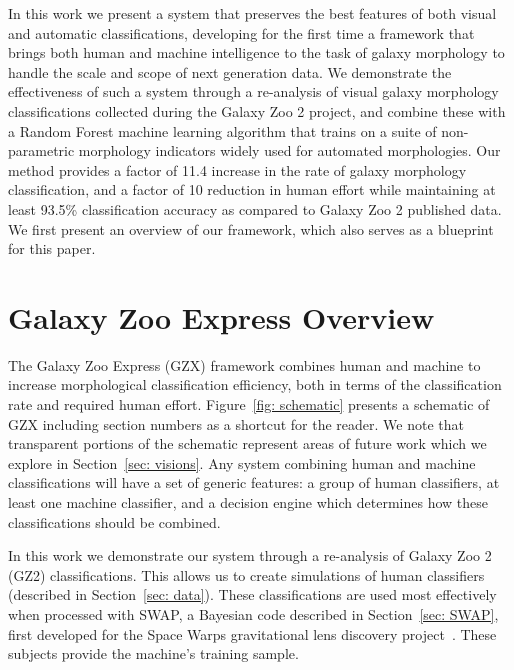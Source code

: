 \documentclass[twocolumn]{aastex6}
\begin{document}
In this work we present a system that preserves the best features of both visual and 
automatic classifications, developing for the first time a framework that brings both 
human and machine intelligence to the task of galaxy morphology to handle the 
scale and scope of next generation data. We demonstrate the effectiveness of such 
a system through a re-analysis of visual galaxy morphology classifications collected 
during the Galaxy Zoo 2 project, and combine these with a Random Forest
machine learning algorithm that trains on a suite of non-parametric morphology 
indicators widely used for automated morphologies. 
Our method provides a factor of 11.4 increase in the rate of galaxy morphology
classification, and a factor of 10 reduction in human effort while maintaining 
at least 93.5\% classification accuracy as compared to Galaxy Zoo 2 published data. 
We first present an overview of our framework, which also serves as a blueprint for this paper. 


\section{Galaxy Zoo Express Overview}

The Galaxy Zoo Express (GZX) framework combines human and machine to 
increase morphological classification efficiency, both in terms of the 
classification rate and required human effort. 
Figure~\ref{fig: schematic} presents a schematic of GZX including section 
numbers as a shortcut for the reader. We note that transparent portions
 of the schematic represent areas of future work which we explore in Section~\ref{sec: visions}. 
Any system combining human and machine classifications will have a set of generic 
features: a group of human classifiers, at least one machine classifier, and a 
decision engine which determines how these classifications should be combined.

In this work we demonstrate our system through a re-analysis of  Galaxy Zoo 2 (GZ2) classifications. 
This allows us to  create simulations of human classifiers (described in Section~\ref{sec: data}).
These classifications are used most effectively when processed with SWAP, 
a Bayesian code described in Section~\ref{sec: SWAP}, first developed for the 
Space Warps gravitational lens discovery project~\citep{Marshall2016}. 
These subjects provide the machine's training sample. 
\end{document}
